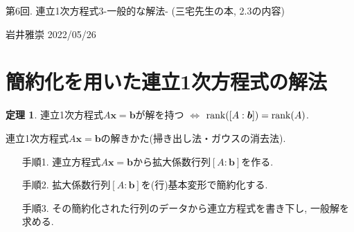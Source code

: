 \documentclass[dvipdfmx,a4paper,11pt]{article}
\theoremstyle{definition}
\newtheorem{thm}{定理}
\begin{document}
\begin{center}
{\Large 第6回. 連立1次方程式3-一般的な解法- (三宅先生の本, 2.3の内容)}
\end{center}

\begin{flushright}
 岩井雅崇 2022/05/26
\end{flushright}

\section{簡約化を用いた連立1次方程式の解法}
\begin{tcolorbox}[
    colback = white,
    colframe = green!35!black,
    fonttitle = \bfseries,
    breakable = true]
    \begin{thm}
連立1次方程式$A\bm{x} =\bm{b}$が解を持つ
$\Leftrightarrow$ ${\rm rank}([A:\bm{b}]) = {\rm rank}(A)$.
  \end{thm}
 \end{tcolorbox}

\begin{tcolorbox}[
    colback = white,
    colframe = green!35!black,
    fonttitle = \bfseries,
    breakable = true]
連立1次方程式$A\bm{x} =\bm{b}$の解きかた(掃き出し法・ガウスの消去法).
 \begin{enumerate}
 \item[手順1.] 連立方程式$A\bm{x} =\bm{b}$から拡大係数行列$[A:\bm{b}]$を作る.
 \item[手順2.] 拡大係数行列$[A:\bm{b}]$を(行)基本変形で簡約化する.
 \item[手順3.] その簡約化された行列のデータから連立方程式を書き下し, 一般解を求める.
 \end{enumerate}
 \end{tcolorbox}
 
\end{document}
